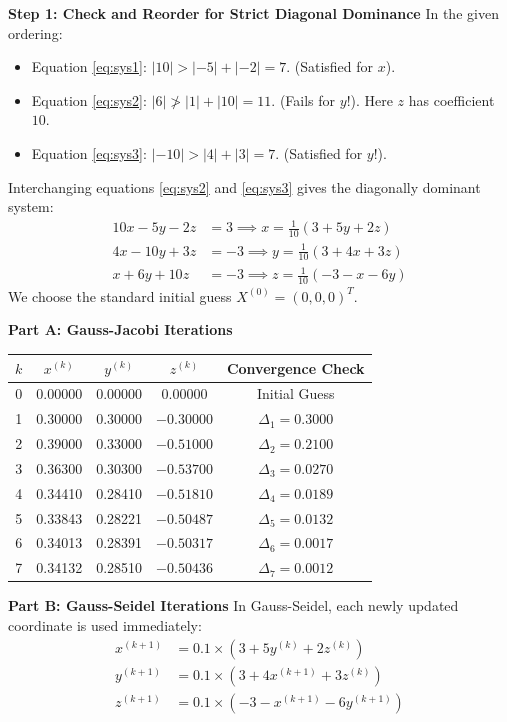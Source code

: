 \documentclass[11pt,a4paper]{article}
\begin{document}
\begin{solbox}
\textbf{Step 1: Check and Reorder for Strict Diagonal Dominance}
In the given ordering:
\begin{itemize}
    \item Equation \eqref{eq:sys1}: $|10| > |-5| + |-2| = 7$. (Satisfied for $x$).
    \item Equation \eqref{eq:sys2}: $|6| \not> |1| + |10| = 11$. (Fails for $y$!). Here $z$ has coefficient $10$.
    \item Equation \eqref{eq:sys3}: $|-10| > |4| + |3| = 7$. (Satisfied for $y$!).
\end{itemize}
Interchanging equations \eqref{eq:sys2} and \eqref{eq:sys3} gives the diagonally dominant system:
\begin{align}
    10x - 5y - 2z &= 3 \implies x = \frac{1}{10}(3 + 5y + 2z) \\
    4x - 10y + 3z &= -3 \implies y = \frac{1}{10}(3 + 4x + 3z) \\
    x + 6y + 10z &= -3 \implies z = \frac{1}{10}(-3 - x - 6y)
\end{align}
We choose the standard initial guess $X^{(0)} = (0, 0, 0)^T$.

\textbf{Part A: Gauss-Jacobi Iterations}
\begin{center}
\begin{tabular}{ccccc}
    \toprule
    $k$ & $x^{(k)}$ & $y^{(k)}$ & $z^{(k)}$ & Convergence Check \\
    \midrule
    0 & 0.00000 & 0.00000 & 0.00000 & Initial Guess \\
    1 & 0.30000 & 0.30000 & $-0.30000$ & $\Delta_1 = 0.3000$ \\
    2 & 0.39000 & 0.33000 & $-0.51000$ & $\Delta_2 = 0.2100$ \\
    3 & 0.36300 & 0.30300 & $-0.53700$ & $\Delta_3 = 0.0270$ \\
    4 & 0.34410 & 0.28410 & $-0.51810$ & $\Delta_4 = 0.0189$ \\
    5 & 0.33843 & 0.28221 & $-0.50487$ & $\Delta_5 = 0.0132$ \\
    6 & 0.34013 & 0.28391 & $-0.50317$ & $\Delta_6 = 0.0017$ \\
    7 & 0.34132 & 0.28510 & $-0.50436$ & $\Delta_7 = 0.0012$ \\
    \bottomrule
\end{tabular}


\end{center}

\textbf{Part B: Gauss-Seidel Iterations}
In Gauss-Seidel, each newly updated coordinate is used immediately:
\begin{align*}
    x^{(k+1)} &= 0.1 \times \left(3 + 5y^{(k)} + 2z^{(k)}\right) \\
    y^{(k+1)} &= 0.1 \times \left(3 + 4x^{(k+1)} + 3z^{(k)}\right) \\
    z^{(k+1)} &= 0.1 \times \left(-3 - x^{(k+1)} - 6y^{(k+1)}\right)
\end{align*}


\end{solbox}
\end{document}
